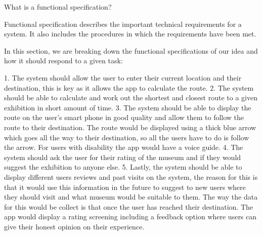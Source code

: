 
What is a functional specification?

Functional specification describes the important technical requirements for a system. It also includes the procedures in which the requirements have been met.

In this section, we are breaking down the functional specifications of our idea and how it should respond to a given task:

1.	The system should allow the user to enter their current location and their destination, this is key as it allows the app to calculate the route.
2.	The system should be able to calculate and work out the shortest and closest route to a given exhibition in short amount of time.
3.	The system should be able to display the route on the user’s smart phone in good quality and allow them to follow the route to their destination. The route would be displayed using a thick blue arrow which goes all the way to their destination, so all the users have to do is follow the arrow. For users with disability the app would have a voice guide.
4.	The system should ask the user for their rating of the museum and if they would suggest the exhibition to anyone else.
5.	Lastly, the system should be able to display different users reviews and past visits on the system, the reason for this is that it would use this information in the future to suggest to new users where they should visit and what museum would be suitable to them. The way the data for this would be collect is that once the user has reached their destination. The app would display a rating screening including a feedback option where users can give their honest opinion on their experience. 
